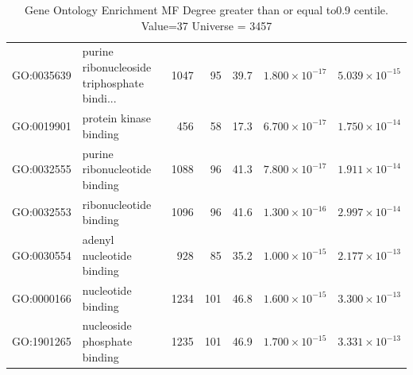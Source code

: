 \begin{table}[ht]
\begin{adjustbox}{max width=\textwidth}
\begin{tabular}{llrrrrr}
  GO:0035639 & purine ribonucleoside triphosphate bindi... & 1047 & 95 & 39.7 & $1.800 \times 10^{-17}$ & $5.039 \times 10^{-15}$ \\ 
  GO:0019901 & protein kinase binding & 456 & 58 & 17.3 & $6.700 \times 10^{-17}$ & $1.750 \times 10^{-14}$ \\ 
  GO:0032555 & purine ribonucleotide binding & 1088 & 96 & 41.3 & $7.800 \times 10^{-17}$ & $1.911 \times 10^{-14}$ \\ 
  GO:0032553 & ribonucleotide binding & 1096 & 96 & 41.6 & $1.300 \times 10^{-16}$ & $2.997 \times 10^{-14}$ \\ 
  GO:0030554 & adenyl nucleotide binding & 928 & 85 & 35.2 & $1.000 \times 10^{-15}$ & $2.177 \times 10^{-13}$ \\ 
  GO:0000166 & nucleotide binding & 1234 & 101 & 46.8 & $1.600 \times 10^{-15}$ & $3.300 \times 10^{-13}$ \\ 
  GO:1901265 & nucleoside phosphate binding & 1235 & 101 & 46.9 & $1.700 \times 10^{-15}$ & $3.331 \times 10^{-13}$ \\ 
   \hline
\end{tabular}
\end{adjustbox}
\caption{Gene Ontology Enrichment MF Degree  greater than or equal to0.9 centile.   Value=37 Universe = 3457} 
\label{tab:Gene Ontology Enrichment MF Degree  greater than or equal to0.9 centile.   Value=37 Universe = 3457}
\end{table}

